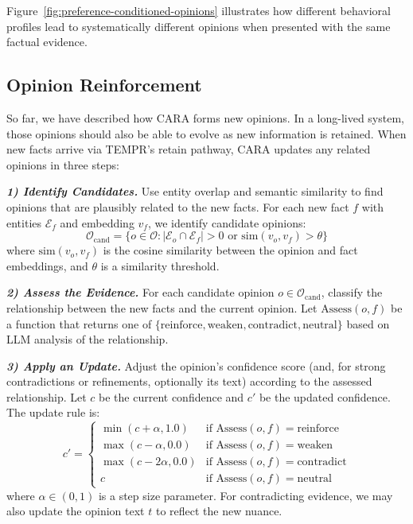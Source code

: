 Figure~\ref{fig:preference-conditioned-opinions} illustrates how different behavioral profiles lead to systematically different opinions when presented with the same factual evidence.

\subsection{Opinion Reinforcement}

So far, we have described how CARA forms new opinions. In a long-lived system, those opinions should also be able to evolve as new information is retained.
When new facts arrive via TEMPR's retain pathway, CARA updates any related opinions in three steps:

\textbf{\textit{1) Identify Candidates.}} Use entity overlap and semantic similarity to find opinions that are plausibly related to the new facts. For each new fact $f$ with entities $\mathcal{E}_f$ and embedding $v_f$, we identify candidate opinions:
\begin{equation}
\mathcal{O}_{\text{cand}} = \{o \in \mathcal{O} : |\mathcal{E}_o \cap \mathcal{E}_f| > 0 \text{ or } \text{sim}(v_o, v_f) > \theta\}
\end{equation}
where $\text{sim}(v_o, v_f)$ is the cosine similarity between the opinion and fact embeddings, and $\theta$ is a similarity threshold.

\textbf{\textit{2) Assess the Evidence.}} For each candidate opinion $o \in \mathcal{O}_{\text{cand}}$, classify the relationship between the new facts and the current opinion. Let $\text{Assess}(o, f)$ be a function that returns one of $\{\text{reinforce}, \text{weaken}, \text{contradict}, \text{neutral}\}$ based on LLM analysis of the relationship.

\textbf{\textit{3) Apply an Update.}} Adjust the opinion's confidence score (and, for strong contradictions or refinements, optionally its text) according to the assessed relationship. Let $c$ be the current confidence and $c'$ be the updated confidence. The update rule is:
\begin{equation}
c' = \begin{cases}
\min(c + \alpha, 1.0) & \text{if Assess}(o, f) = \text{reinforce} \\
\max(c - \alpha, 0.0) & \text{if Assess}(o, f) = \text{weaken} \\
\max(c - 2\alpha, 0.0) & \text{if Assess}(o, f) = \text{contradict} \\
c & \text{if Assess}(o, f) = \text{neutral}
\end{cases}
\end{equation}
where $\alpha \in (0,1)$ is a step size parameter. For contradicting evidence, we may also update the opinion text $t$ to reflect the new nuance.

